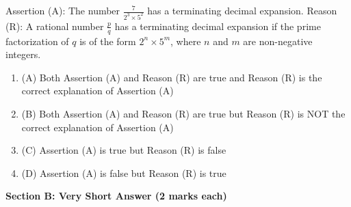 \documentclass[12pt,a4paper]{exam}
\begin{document}
\begin{questions}
\question[1] Assertion (A): The number $\frac{7}{2^3 \times 5^2}$ has a terminating decimal expansion.
Reason (R): A rational number $\frac{p}{q}$ has a terminating decimal expansion if the prime factorization of $q$ is of the form $2^n \times 5^m$, where $n$ and $m$ are non-negative integers.
\begin{enumerate}[label=(\Alph*)]
  \item (A) Both Assertion (A) and Reason (R) are true and Reason (R) is the correct explanation of Assertion (A)
  \item (B) Both Assertion (A) and Reason (R) are true but Reason (R) is NOT the correct explanation of Assertion (A)
  \item (C) Assertion (A) is true but Reason (R) is false
  \item (D) Assertion (A) is false but Reason (R) is true
\end{enumerate}
\vspace{0.15cm}

\end{questions}
\bigskip
\noindent\textbf{\large Section B: Very Short Answer (2 marks each)}
\end{document}
